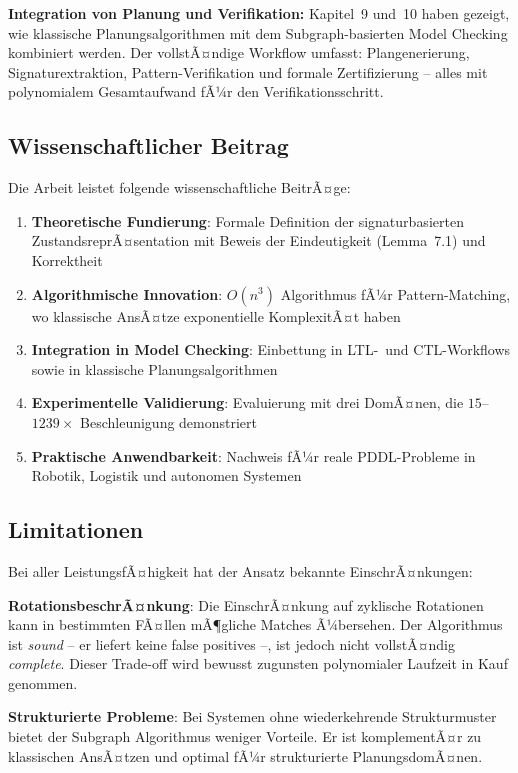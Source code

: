 ﻿\documentclass[a4paper,12pt]{article}
\theoremstyle{definition}
\begin{document}
\textbf{Integration von Planung und Verifikation:} Kapitel~9 und~10 haben gezeigt, wie klassische Planungsalgorithmen mit dem Subgraph-basierten Model Checking kombiniert werden. Der vollstÃ¤ndige Workflow umfasst: Plangenerierung, Signaturextraktion, Pattern-Verifikation und formale Zertifizierung -- alles mit polynomialem Gesamtaufwand fÃ¼r den Verifikationsschritt.

\subsection{Wissenschaftlicher Beitrag}

Die Arbeit leistet folgende wissenschaftliche BeitrÃ¤ge:

\begin{enumerate}
	\item \textbf{Theoretische Fundierung}: Formale Definition der signaturbasierten ZustandsreprÃ¤sentation mit Beweis der Eindeutigkeit (Lemma~7.1) und Korrektheit
	\item \textbf{Algorithmische Innovation}: $O(n^3)$ Algorithmus fÃ¼r Pattern-Matching, wo klassische AnsÃ¤tze exponentielle KomplexitÃ¤t haben
	\item \textbf{Integration in Model Checking}: Einbettung in LTL-~und CTL-Workflows
	      sowie in klassische Planungsalgorithmen
	\item \textbf{Experimentelle Validierung}: Evaluierung mit drei DomÃ¤nen,
	      die $15$--$1239\times$ Beschleunigung demonstriert
	\item \textbf{Praktische Anwendbarkeit}: Nachweis fÃ¼r reale
	      PDDL-Probleme in Robotik, Logistik und autonomen Systemen
\end{enumerate}

\subsection{Limitationen}

Bei aller LeistungsfÃ¤higkeit hat der Ansatz bekannte EinschrÃ¤nkungen:

\textbf{RotationsbeschrÃ¤nkung}: Die EinschrÃ¤nkung auf zyklische Rotationen kann in bestimmten FÃ¤llen mÃ¶gliche Matches Ã¼bersehen. Der Algorithmus ist \textit{sound} -- er liefert keine false positives --, ist jedoch nicht vollstÃ¤ndig \textit{complete}. Dieser Trade-off wird bewusst zugunsten polynomialer Laufzeit in Kauf genommen.

\textbf{Strukturierte Probleme}: Bei Systemen ohne wiederkehrende Strukturmuster bietet der Subgraph Algorithmus weniger Vorteile. Er ist komplementÃ¤r zu klassischen AnsÃ¤tzen und optimal fÃ¼r strukturierte PlanungsdomÃ¤nen.
\end{document}
